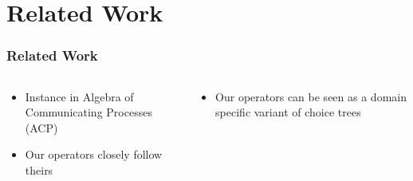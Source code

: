 \documentclass[fleqn,aspectratio=169,10pt]{beamer}
\begin{document}

\section{Related Work}

\begin{frame}[fragile]
  \frametitle{Related Work}
    \pause
  \vspace*{-2ex}
  \begin{columns}
    \begin{column}{.45\textwidth}
      \begin{itemize}
        \item Instance in Algebra of Communicating Processes (ACP)
        \item Our operators closely follow theirs
      \end{itemize}
      \vspace*{-2ex}
      \begin{figure}
        \centering
      \end{figure}
    \end{column}
    \pause
    \begin{column}{.45\textwidth}
      \begin{itemize}
        \item Our operators can be seen as a domain specific variant of choice trees
      \end{itemize}
      \vspace*{-2ex}
      \begin{figure}
        \centering

\end{figure}
\end{column}
\end{columns}
\end{frame}
\end{document}
